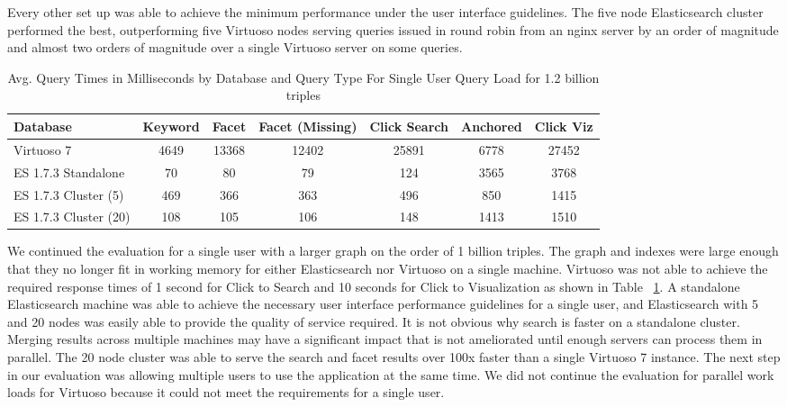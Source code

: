 Every other set up was able to achieve the minimum performance under the user interface guidelines. 
The five node Elasticsearch cluster performed the best, outperforming five Virtuoso nodes serving queries issued in round robin from an nginx server by an order of magnitude and almost two orders of magnitude over a single Virtuoso server on some queries. 

\begin{table} 
\centering
\scriptsize{
    \begin{tabular}{ l||c|c|c|c|c|c }
        Database & Keyword & Facet & Facet (Missing) & Click Search & Anchored & Click Viz \\ \hline
        Virtuoso 7 & 4649 & 13368 & 12402 & 25891 & 6778 &  27452 \\ 
        ES 1.7.3 Standalone & 70 & 80 & 79 & 124 & 3565 & 3768 \\ 
        ES 1.7.3 Cluster (5) & 469 & 366 & 363 & 496 & 850 & 1415 \\ 
        ES 1.7.3 Cluster (20) & 108 & 105 & 106 & 148 & 1413 & 1510 \\ 
    \end{tabular} 
    }
    \centering
    \caption{Avg. Query Times in Milliseconds by Database and Query Type For Single User Query Load for 1.2 billion triples}
    \label{table:qt_single_user_1b}
    \vspace{-0.2cm}
\end{table}

We continued the evaluation for a single user with a larger graph on the order of 1 billion triples.  
The graph and indexes were large enough that they no longer fit in working memory for either Elasticsearch nor Virtuoso on a single machine.
Virtuoso was not able to achieve the required response times of 1 second for Click to Search and 10 seconds for Click to Visualization as shown in Table ~\ref{table:qt_single_user_1b}.
A standalone Elasticsearch machine was able to achieve the necessary user interface performance guidelines for a single user, and Elasticsearch with 5 and 20 nodes was easily able to provide the quality of service required.
It is not obvious why search is faster on a standalone cluster.
Merging results across multiple machines may have a significant impact that is not ameliorated until enough servers can process them in parallel. 
The 20 node cluster was able to serve the search and facet results over 100x faster than a single Virtuoso 7 instance. 
The next step in our evaluation was allowing multiple users to use the application at the same time.
We did not continue the evaluation for parallel work loads for Virtuoso because it could not meet the requirements for a single user.

